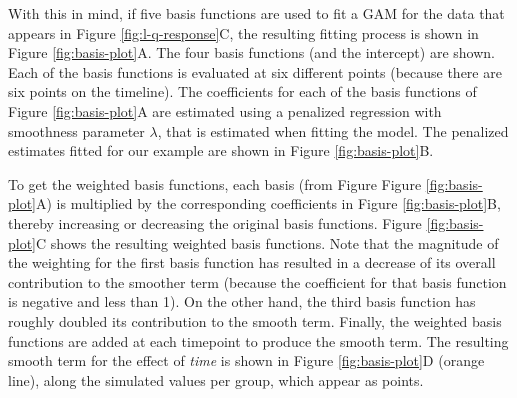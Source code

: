 \documentclass[
]{article}
\begin{document}
With this in mind, if five basis functions are used to fit a GAM for the data that appears in Figure \ref{fig:l-q-response}C, the resulting fitting process is shown in Figure \ref{fig:basis-plot}A. The four basis functions (and the intercept) are shown. Each of the basis functions is evaluated at six different points (because there are six points on the timeline). The coefficients for each of the basis functions of Figure \ref{fig:basis-plot}A are estimated using a penalized regression with smoothness parameter \(\lambda\), that is estimated when fitting the model. The penalized estimates fitted for our example are shown in Figure \ref{fig:basis-plot}B.

To get the weighted basis functions, each basis (from Figure Figure \ref{fig:basis-plot}A) is multiplied by the corresponding coefficients in Figure \ref{fig:basis-plot}B, thereby increasing or decreasing the original basis functions. Figure \ref{fig:basis-plot}C shows the resulting weighted basis functions. Note that the magnitude of the weighting for the first basis function has resulted in a decrease of its overall contribution to the smoother term (because the coefficient for that basis function is negative and less than 1). On the other hand, the third basis function has roughly doubled its contribution to the smooth term. Finally, the weighted basis functions are added at each timepoint to produce the smooth term. The resulting smooth term for the effect of \emph{time} is shown in Figure \ref{fig:basis-plot}D (orange line), along the simulated values per group, which appear as points.
\end{document}
